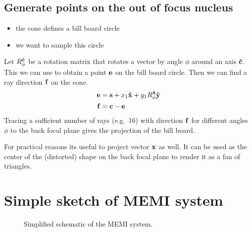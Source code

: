 \documentclass[twocolumn,DIV19]{scrartcl}
\begin{document}
\subsection{Generate points on the out of focus nucleus}
\begin{itemize}
\item the cone defines a bill board circle
\item we want to sample this circle
\end{itemize}
Let $R_\phi^{\mathbf{\hat{c}}}$ be a rotation matrix that rotates a vector by angle
$\phi$ around an axis $\mathbf{\hat{c}}$. This we can use to obtain a point $\mathbf{e}$
on the bill board circle. Then we can find a ray direction $\mathbf{f}$ on the
cone.
\begin{align}
  \mathbf{e}&=\mathbf{s}+x_1\mathbf{\hat{x}}+y_1R_\phi^{\mathbf{\hat{x}}}\mathbf{\hat{y}}\\
  \mathbf{f}&=\mathbf{c}-\mathbf{e}
\end{align}
Tracing a sufficient number of rays (e.g.\ 16) with direction $\mathbf{f}$ for
different angles $\phi$ to the back focal plane gives the projection
of the bill board.

For practical reasons its useful to project vector $\mathbf{x}$ as well. It
can be used as the center of the (distorted) shape on the back focal
plane to render it as a fan of triangles.
\newcommand{\figref}[1]{\figurename~\ref{#1}}

\section{Simple sketch of MEMI system}
\begin{figure}[!hbt]
  \centering
  
  \caption{Simplified schematic of the MEMI system.}
\end{figure}
\end{document}
